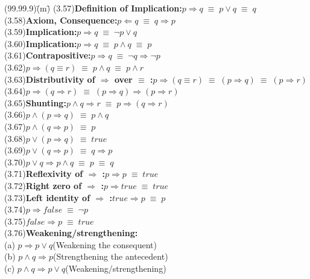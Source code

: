 \documentclass[fleqn, leqno]{article}
\newcommand{\lgap}{2pt}                             %
\newcommand{\equivs}{\ensuremath{\;\equiv\;}}       %
\newcommand{\impl}{\ensuremath{\Rightarrow}}        %
\newcommand{\foll}{\ensuremath{\Leftarrow}}         %
\begin{document}
\begin{tabbing}
(99.99.9)\;\=(m)\;\=\kill
(3.57)\>\textbf{Definition of Implication:}\quad $p\impl q \equivs p\lor q \equivs q$\\[\lgap]
(3.58)\>\textbf{Axiom, Consequence:}\quad $p\foll q \equivs q\impl p$\\[\lgap]
(3.59)\>\textbf{Implication:}\quad $p\impl q \equivs \neg p \lor q$\\[\lgap]
(3.60)\>\textbf{Implication:}\quad $p\impl q \equivs p\land q \equivs p$\\[\lgap]
(3.61)\>\textbf{Contrapositive:}\quad $p\impl q \equivs \neg q\impl \neg p$\\[\lgap]
(3.62)\>$p\impl (q\equiv r) \equivs p\land q\equivs p\land r$\\[\lgap]
(3.63)\>\textbf{Distributivity of $\impl$ over $\equiv$ :}\quad $p\impl (q\equiv r)\equivs (p\impl q)\equivs (p\impl r)$\\[\lgap]
(3.64)\>$p\impl (q\impl r) \equivs (p\impl q)\impl (p\impl r)$\\[\lgap]
(3.65)\>\textbf{Shunting:}\quad $p\land q\impl r\equivs p\impl (q\impl r)$\\[\lgap]
(3.66)\>$p\land (p\impl q) \equivs p\land q$\\[\lgap]
(3.67)\>$p\land (q\impl p) \equivs p$\\[\lgap]
(3.68)\>$p\lor (p\impl q) \equivs true$\\[\lgap]
(3.69)\>$p\lor (q\impl p) \equivs q\impl p$\\[\lgap]
(3.70)\>$p\lor q \impl p\land q \equivs p \equivs q$\\[\lgap]
(3.71)\>\textbf{Reflexivity of $\impl$ :}\quad $p\impl p \equivs true$\\[\lgap]
(3.72)\>\textbf{Right zero of $\impl$ :}\quad $p\impl true \equivs true$\\[\lgap]
(3.73)\>\textbf{Left identity of $\impl$ :}\quad $true\impl p \equivs p$\\[\lgap]
(3.74)\>$p\impl false \equivs \neg p$\\[\lgap]
(3.75)\>$false\impl p \equivs true$\\[\lgap]
(3.76)\>\textbf{Weakening/strengthening:}\\
      \> (a)\> $p\impl p\lor q$\quad \quad \quad (Weakening the consequent)\\[\lgap]
      \> (b)\> $p\land q \impl p$\quad \quad \quad (Strengthening the antecedent)\\[\lgap]
      \> (c)\> $p\land q \impl p\lor q$\quad \quad \quad (Weakening/strengthening)\\[\lgap]

\end{tabbing}
\end{document}

